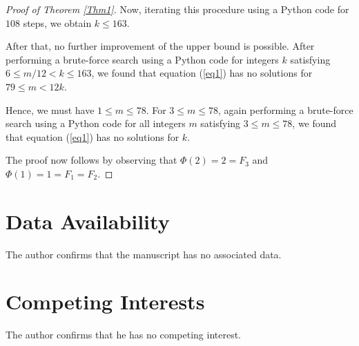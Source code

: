 \documentclass[12pt,reqno]{amsart}
\begin{document}
\begin{proof}[Proof of Theorem \ref{Thm1}]
Now, iterating this procedure using a Python code \cite{Sagar} for $108$ steps, we obtain $k\leq 163$.

After that, no further improvement of the upper bound is possible.
After performing a brute-force search using a Python code \cite{Sagar} for integers $k$ satisfying $6\leq m/12<k\leq 163$, we found that equation (\ref{eq1}) has no solutions for $79\leq m<12k$.

Hence, we must have $1\leq m\leq 78$.
For $3\leq m\leq 78$, again performing a brute-force search using a Python code \cite{Sagar} for all integers $m$ satisfying $3\leq m\leq 78$, we found that equation (\ref{eq1}) has no solutions for $k$.

The proof now follows by observing that $\Phi(2)=2=F_3$ and $\Phi(1)=1=F_1=F_2$.
\end{proof}

\section{Data Availability} 	
The author confirms that the manuscript has no associated data.

\section{Competing Interests}
The author confirms that he has no competing interest. 
\end{document}
